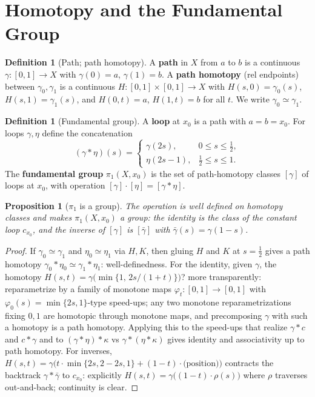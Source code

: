 \documentclass[11pt,a4paper]{article}
\newtheorem{proposition}[theorem]{Proposition}
\theoremstyle{definition}
\newtheorem{definition}[theorem]{Definition}
\begin{document}
	\tableofcontents
	\newpage
	
	\section{Homotopy and the Fundamental Group}
	
	\begin{definition}[Path; path homotopy]
		A \textbf{path} in $X$ from $a$ to $b$ is a continuous $\gamma:[0,1]\to X$ with $\gamma(0)=a$,
		$\gamma(1)=b$. A \textbf{path homotopy} (rel endpoints) between $\gamma_0,\gamma_1$ is a continuous
		$H:[0,1]\times[0,1]\to X$ with $H(s,0)=\gamma_0(s)$, $H(s,1)=\gamma_1(s)$, and
		$H(0,t)=a$, $H(1,t)=b$ for all $t$. We write $\gamma_0\simeq\gamma_1$.
	\end{definition}
	
	\begin{definition}[Fundamental group]
		A \textbf{loop} at $x_0$ is a path with $a=b=x_0$. For loops $\gamma,\eta$ define the concatenation
		\[
		(\gamma*\eta)(s)=
		\begin{cases}
			\gamma(2s), & 0\le s\le\tfrac12,\\
			\eta(2s-1), & \tfrac12\le s\le1.
		\end{cases}
		\]
		The \textbf{fundamental group} $\pi_1(X,x_0)$ is the set of path-homotopy classes $[\gamma]$ of loops
		at $x_0$, with operation $[\gamma]\cdot[\eta]=[\gamma*\eta]$.
	\end{definition}
	
	\begin{proposition}[$\pi_1$ is a group]\label{prop:pi1-group}
		The operation is well defined on homotopy classes and makes $\pi_1(X,x_0)$ a group: the identity is
		the class of the constant loop $c_{x_0}$, and the inverse of $[\gamma]$ is $[\bar\gamma]$ with
		$\bar\gamma(s)=\gamma(1-s)$.
	\end{proposition}
	\begin{proof}
		If $\gamma_0\simeq\gamma_1$ and $\eta_0\simeq\eta_1$ via $H,K$, then gluing $H$ and $K$ at $s=\tfrac12$
		gives a path homotopy $\gamma_0*\eta_0\simeq\gamma_1*\eta_1$: well-definedness. For the identity,
		given $\gamma$, the homotopy
		$H(s,t)=\gamma\big(\min\{1,\,2s/(1+t)\}\big)$? more transparently: reparametrize by a family of
		monotone maps $\varphi_t:[0,1]\to[0,1]$ with $\varphi_0(s)=\min\{2s,1\}$-type speed-ups; any two
		monotone reparametrizations fixing $0,1$ are homotopic through monotone maps, and precomposing
		$\gamma$ with such a homotopy is a path homotopy. Applying this to the speed-ups that realize
		$\gamma*c$ and $c*\gamma$ and to $(\gamma*\eta)*\kappa$ vs $\gamma*(\eta*\kappa)$ gives identity and
		associativity up to path homotopy. For inverses, $H(s,t)=\gamma\big(t\cdot\min\{2s,2-2s,1\}+(1-t)\cdot
		\text{(position)}\big)$ contracts the backtrack $\gamma*\bar\gamma$ to $c_{x_0}$: explicitly
		$H(s,t)=\gamma\big((1-t)\cdot\rho(s)\big)$ where $\rho$ traverses out-and-back; continuity is clear.
	\end{proof}
	
\end{document}
